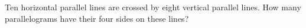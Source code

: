 Ten horizontal parallel lines are crossed by eight vertical parallel lines. How many parallelograms have their four sides on these lines?
